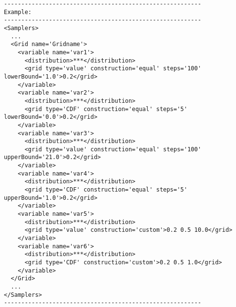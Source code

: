 \begin{lstlisting}[style=XML]
---------------------------------------------------------
Example:
---------------------------------------------------------
<Samplers>
  ...
  <Grid name='Gridname'> 
    <variable name='var1'> 
      <distribution>***</distribution>
      <grid	type='value' construction='equal' steps='100' lowerBound='1.0'>0.2</grid>	
    </variable> 
    <variable name='var2'> 
      <distribution>***</distribution>
      <grid	type='CDF' construction='equal' steps='5' lowerBound='0.0'>0.2</grid>	
    </variable>
    <variable name='var3'> 
      <distribution>***</distribution>
      <grid	type='value' construction='equal' steps='100' upperBound='21.0'>0.2</grid>	
    </variable> 
    <variable name='var4'> 
      <distribution>***</distribution>
      <grid	type='CDF' construction='equal' steps='5' upperBound='1.0'>0.2</grid>	
    </variable>
    <variable name='var5'> 
      <distribution>***</distribution>
      <grid	type='value' construction='custom'>0.2 0.5 10.0</grid>	
    </variable> 
    <variable name='var6'> 
      <distribution>***</distribution>
      <grid	type='CDF' construction='custom'>0.2 0.5 1.0</grid>	
    </variable>
  </Grid>
  ...
</Samplers>
---------------------------------------------------------
\end{lstlisting}
 
